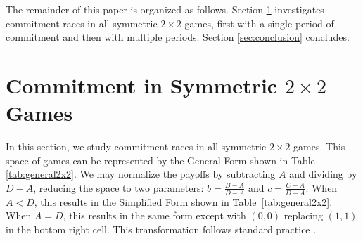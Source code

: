 \documentclass[letterpaper]{article}
\newcommand{\bparam}{b}
\newcommand{\cparam}{c}
\theoremstyle{definition}
\begin{document}
The remainder of this paper is organized as follows. Section \ref{sec:commitment-in-symmetric-2x2-games} investigates commitment races in all symmetric $2\times2$ games, first with a single period of commitment and then with multiple periods. Section \ref{sec:conclusion} concludes.


\section{Commitment in Symmetric $2\times2$ Games}\label{sec:commitment-in-symmetric-2x2-games}


In this section, we study commitment races in all symmetric $2\times 2$ games. This space of games can be represented by the General Form shown in Table \ref{tab:general2x2}. We may normalize the payoffs by subtracting $A$ and dividing by $D - A$, reducing the space to two parameters: $\bparam = \frac{B - A}{D - A}$ and $\cparam = \frac{C - A}{D - A}$. When $A < D$, this results in the Simplified Form shown in Table~\ref{tab:general2x2}. When $A = D$, this results in the same form except with $(0,0)$ replacing $(1,1)$ in the bottom right cell. This transformation follows standard practice  \citep[see][and references therein]{tewolde_game_2024}.

\end{document}
